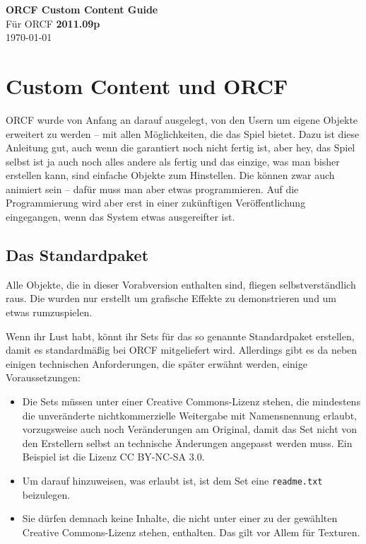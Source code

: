 \documentclass[a4paper]{article}
\newcommand{\cfile}[1]{\texttt{#1}}
\begin{document}
\pagestyle{fancy}
\fancyhf{}
\fancyfoot[R]{\huge{\thepage}}

\vspace*{\fill}
\begin{center}
  \Huge{\textbf{ORCF Custom Content Guide}} \\
  \vspace{2cm}
  \large{Für ORCF \textbf{2011.09p}} \\
  \vspace{1cm}
  \large{\today}
  \vspace{3cm}
\end{center}
\vfill

\newpage

\tableofcontents

\newpage

\section{Custom Content und ORCF}
ORCF wurde von Anfang an darauf ausgelegt, von den Usern um eigene Objekte erweitert zu werden -- mit allen Möglichkeiten, die das Spiel bietet. Dazu ist
diese Anleitung gut, auch wenn die garantiert noch nicht fertig ist, aber hey, das Spiel selbst ist ja auch noch alles andere als fertig und das einzige,
was man bisher erstellen kann, sind einfache Objekte zum Hinstellen. Die können zwar auch animiert sein -- dafür muss man aber etwas programmieren. Auf
die Programmierung wird aber erst in einer zukünftigen Veröffentlichung eingegangen, wenn das System etwas ausgereifter ist.

\subsection{Das Standardpaket}
Alle Objekte, die in dieser Vorabversion enthalten sind, fliegen selbstverständlich raus. Die wurden nur erstellt um grafische Effekte zu demonstrieren
und um etwas rumzuspielen.

Wenn ihr Lust habt, könnt ihr Sets für das so genannte Standardpaket erstellen, damit es standardmäßig bei ORCF mitgeliefert wird. Allerdings gibt es da
neben einigen technischen Anforderungen, die später erwähnt werden, einige Voraussetzungen:
\begin{itemize}
\item
  Die Sets müssen unter einer Creative Commons-Lizenz stehen, die mindestens die unveränderte nichtkommerzielle Weitergabe mit Namensnennung erlaubt,
  vorzugsweise auch noch Veränderungen am Original, damit das Set nicht von den Erstellern selbst an technische Änderungen angepasst werden muss. Ein
  Beispiel ist die Lizenz CC BY-NC-SA 3.0.
\item
  Um darauf hinzuweisen, was erlaubt ist, ist dem Set eine \cfile{readme.txt} beizulegen.
\item
  Sie dürfen demnach keine Inhalte, die nicht unter einer zu der gewählten Creative Commons-Lizenz stehen, enthalten. Das gilt vor Allem für Texturen.
\end{itemize}
\end{document}
